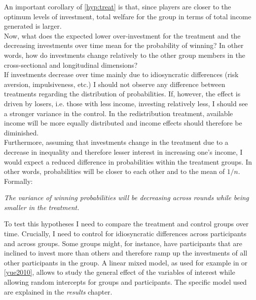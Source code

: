     An important corollary of \cref{hyp:treat} is that, since players are closer to the optimum levels of investment, total welfare for the group in terms of total income generated is larger.\\
    
    Now, what does the expected lower over-investment for the treatment and the decreasing investments over time mean for the probability of winning? In other words, how do investments change relatively to the other group members in the cross-sectional and longitudinal dimensions?\\
    
    If investments decrease over time mainly due to idiosyncratic differences (risk aversion, impulsiveness, etc.) I should not observe any difference between treatments regarding the distribution of probabilities. If, however, the effect is driven by losers, i.e. those with less income, investing relatively less, I should see a stronger variance in the control. In the redistribution treatment, available income will be more equally distributed and income effects should therefore be diminished.\\
    
    Furthermore, assuming that investments change in the treatment due to a decrease in inequality and therefore lesser interest in increasing one's income, I would expect a reduced difference in probabilities within the treatment groups. In other words, probabilities will be closer to each other and to the mean of $1/n$. Formally:
    
    \begin{hyp}\label{hyp:wins}
    \textit{The variance of winning probabilities will be decreasing across rounds while being smaller in the treatment.}
    \end{hyp}
          
    To test this hypotheses I need to compare the treatment and control groups over time. Crucially, I need to control for idiosyncratic differences across participants and across groups. Some groups might, for instance, have participants that are inclined to invest more than others and therefore ramp up the investments of all other participants in the group. A linear mixed model, as used for example in \cite{szaszi2018} or \ref{yue2010}, allows to study the general effect of the variables of interest while allowing random intercepts for groups and participants. The specific model used are explained in the \textit{results} chapter.\\ 
    
 
